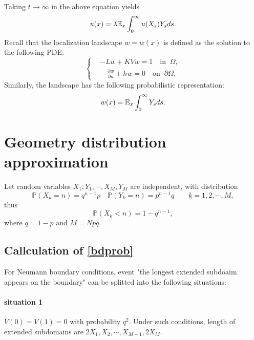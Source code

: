 \documentclass[a4paper,11pt]{article}
\begin{document}
\begin{appendices}
\begin{equation*}
\end{equation*}
Taking $t\rightarrow\infty$ in the above equation yields
\begin{equation*}
u(x) = \lambda\mathbb{E}_x\int_0^\infty u(X_s)Y_sds.
\end{equation*}
Recall that the localization landscape $w = w(x)$ is defined as the solution to the following PDE:
\begin{equation*}
\left\{
\begin{split}
& -Lw+KVw = 1 \quad \textrm{in}\;\;\Omega, \\
& \quad \frac{\partial w}{\partial n}+hw = 0 \quad \textrm{on} \; \; \partial \Omega,
\end{split}\right.
\end{equation*}
Similarly, the landscape has the following probabilistic representation:
\begin{equation*}
w(x) = \mathbb{E}_x\int_0^\infty Y_sds.
\end{equation*}

\section{Geometry distribution approximation}\label{AppendixB}

Let random variables $X_1, Y_1, \cdots, X_M, Y_M$ are independent, with distribution
$$ \mathbb{P}(X_k = n) = q^{n-1} p \quad \mathbb{P}(Y_k = n) = p^{n-1} q \qquad k = 1, 2, \cdots, M, $$
thus
$$ \mathbb{P}(X_k < n) = 1 - q^{n-1}, $$
where $q = 1 - p$ and $M = N p q$.

\subsection{Callculation of \eqref{bdprob}}\label{AppendixB1}

For Neumann boundary conditions, event "the longest extended subdoaim appears on the boundary" can be splitted into the following situations:

\paragraph*{situation 1}
$V(0) = V(1) = 0$ with probability $q^2$. Under such conditions, length of extended subdomains are $2 X_1, X_2, \cdots, X_{M-1}, 2 X_M$.


\end{appendices}
\end{document}
